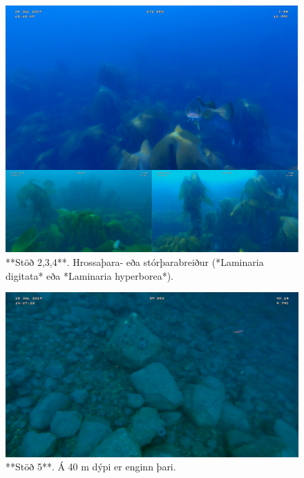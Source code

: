 \documentclass[icelandic,]{book}
\begin{document}
\begin{figure}

{\centering \includegraphics[width=1\linewidth]{skjol/skogar/sk4/samsett} 

}

\caption{**Stöð 2,3,4**. Hrossaþara- eða stórþarabreiður (*Laminaria digitata* eða *Laminaria hyperborea*).}\label{fig:mynd-sk-fjogur-stodvar-tvo-4}
\end{figure}

\begin{figure}

{\centering \includegraphics[width=1\linewidth]{skjol/skogar/sk4/stodvar/st5/sk4-st5} 

}

\caption{**Stöð 5**. Á 40 m dýpi er enginn þari.}\label{fig:mynd-sk-fjogur-stod-fimm}
\end{figure}
\end{document}
